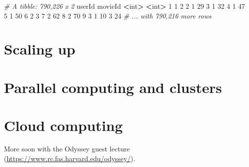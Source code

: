\documentclass[]{book}
\newenvironment{Shaded}{\begin{snugshade}}{\end{snugshade}}
\newcommand{\KeywordTok}[1]{\textcolor[rgb]{0.13,0.29,0.53}{\textbf{#1}}}
\newcommand{\DecValTok}[1]{\textcolor[rgb]{0.00,0.00,0.81}{#1}}
\newcommand{\StringTok}[1]{\textcolor[rgb]{0.31,0.60,0.02}{#1}}
\newcommand{\CommentTok}[1]{\textcolor[rgb]{0.56,0.35,0.01}{\textit{#1}}}
\newcommand{\OperatorTok}[1]{\textcolor[rgb]{0.81,0.36,0.00}{\textbf{#1}}}
\newcommand{\ErrorTok}[1]{\textcolor[rgb]{0.64,0.00,0.00}{\textbf{#1}}}
\newcommand{\NormalTok}[1]{#1}
\theoremstyle{definition}
\theoremstyle{definition}
\theoremstyle{definition}
\theoremstyle{remark}
\begin{document}
\begin{Shaded}
\end{Shaded}

\begin{Shaded}
\begin{Highlighting}[]
\CommentTok{# A tibble: 790,226 x 2}
\NormalTok{   userId movieId}
    \OperatorTok{<}\NormalTok{int}\OperatorTok{>}\StringTok{   }\ErrorTok{<}\NormalTok{int}\OperatorTok{>}
\StringTok{ }\DecValTok{1}      \DecValTok{1}       \DecValTok{2}
 \DecValTok{2}      \DecValTok{1}      \DecValTok{29}
 \DecValTok{3}      \DecValTok{1}      \DecValTok{32}
 \DecValTok{4}      \DecValTok{1}      \DecValTok{47}
 \DecValTok{5}      \DecValTok{1}      \DecValTok{50}
 \DecValTok{6}      \DecValTok{2}       \DecValTok{3}
 \DecValTok{7}      \DecValTok{2}      \DecValTok{62}
 \DecValTok{8}      \DecValTok{2}      \DecValTok{70}
 \DecValTok{9}      \DecValTok{3}       \DecValTok{1}
\DecValTok{10}      \DecValTok{3}      \DecValTok{24}
\CommentTok{# ... with 790,216 more rows}
\end{Highlighting}
\end{Shaded}

\section{Scaling up}\label{scaling-up}

\section{Parallel computing and
clusters}\label{parallel-computing-and-clusters}

\section{Cloud computing}\label{cloud-computing}

More soon with the Odyssey guest lecture
(\url{https://www.rc.fas.harvard.edu/odyssey/}).
\end{document}
